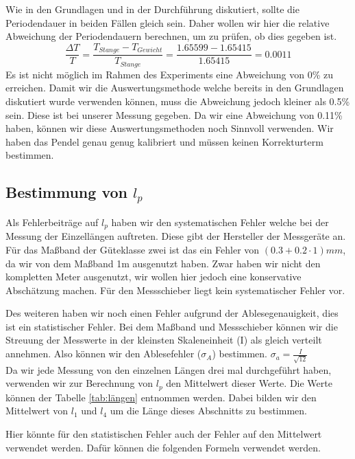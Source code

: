 \documentclass[twoside]{protokoll}
\begin{document}
Wie in den Grundlagen und in der Durchführung diskutiert, sollte die Periodendauer in beiden Fällen gleich sein.
Daher wollen wir hier die relative Abweichung der Periodendauern berechnen, um zu prüfen, ob dies gegeben ist.
\begin{equation}
    \frac{\Delta T}{T} = \frac{T_{Stange} - T_{Gewicht}}{T_{Stange}} = \frac{1.65599 - 1.65415}{1.65415} = 0.0011
    \label{eq:abweichung_T}
\end{equation}
Es ist nicht möglich im Rahmen des Experiments eine Abweichung von 0\% zu erreichen.
Damit wir die Auswertungsmethode welche bereits in den Grundlagen diskutiert wurde verwenden können, muss die Abweichung jedoch kleiner als 0.5\% sein. 
Diese ist bei unserer Messung gegeben. 
Da wir eine Abweichung von 0.11\% haben, können wir diese Auswertungsmethoden noch Sinnvoll verwenden. 
Wir haben das Pendel genau genug kalibriert und müssen keinen Korrekturterm bestimmen.\\

 
\subsection{Bestimmung von $l_p$}

Als Fehlerbeiträge auf $l_p$ haben wir den systematischen Fehler welche bei der Messung der Einzellängen auftreten.
Diese gibt der Hersteller der Messgeräte an. 
Für das Maßband der Güteklasse zwei ist das ein Fehler von $(0.3 + 0.2\cdot1)mm$, da wir von dem Maßband 1m ausgenutzt haben.
Zwar haben wir nicht den kompletten Meter ausgenutzt, wir wollen hier jedoch eine konservative Abschätzung machen. 
Für den Messschieber liegt kein systematischer Fehler vor.

Des weiteren haben wir noch einen Fehler aufgrund der Ablesegenauigkeit, dies ist ein statistischer Fehler.
Bei dem Maßband und Messschieber können wir die Streuung der Messwerte in der kleinsten Skaleneinheit (I) als gleich verteilt annehmen. 
Also können wir den Ablesefehler ($\sigma_A$) bestimmen. $\sigma_a = \frac{I}{\sqrt{12}}$\\

Da wir jede Messung von den einzelnen Längen drei mal durchgeführt haben, verwenden wir zur Berechnung von $l_p$ den Mittelwert dieser Werte. 
Die Werte können der Tabelle \ref{tab:längen} entnommen werden. 
Dabei bilden wir den Mittelwert von $l_1$ und $l_4$ um die Länge dieses Abschnitts zu bestimmen.

Hier könnte für den statistischen Fehler auch der Fehler auf den Mittelwert verwendet werden. 
Dafür können die folgenden Formeln verwendet werden. 
\end{document}
